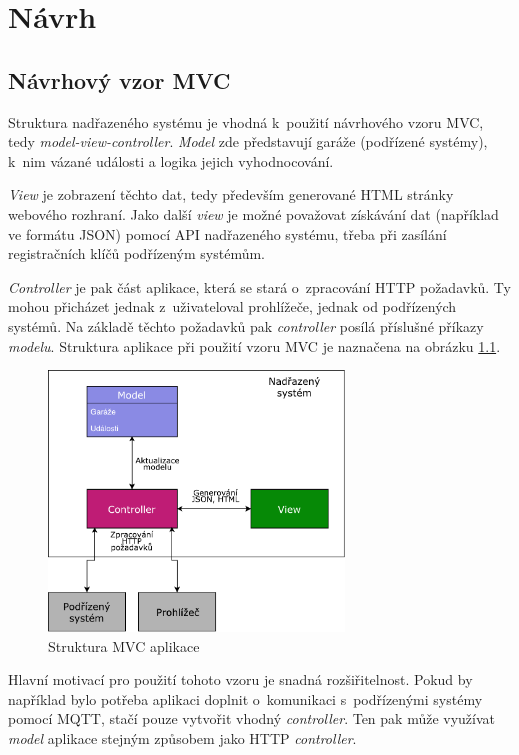 \chapter{Návrh}
\label{sec:de}

\section{Návrhový vzor MVC}
\label{sec:de_mvc}

Struktura nadřazeného systému je vhodná k~použití návrhového vzoru MVC, tedy \textit{model-view-controller}. \textit{Model} zde představují garáže (podřízené systémy), k~nim vázané události a logika jejich vyhodnocování. 

\textit{View} je zobrazení těchto dat, tedy především generované HTML stránky webového rozhraní. Jako další \textit{view} je možné považovat získávání dat (například ve formátu JSON) pomocí API nadřazeného systému, třeba při zasílání registračních klíčů podřízeným systémům.

\textit{Controller} je pak část aplikace, která se stará o~zpracování HTTP požadavků. Ty mohou přicházet jednak z~uživateloval prohlížeče, jednak od podřízených systémů. Na základě těchto požadavků pak \textit{controller} posílá příslušné příkazy \textit{modelu}. Struktura aplikace při použití vzoru MVC je naznačena na obrázku \ref{fig:mvc}.

\begin{figure}[h!]
    \centering
    \includegraphics[width=0.7\textwidth]{images/mvc.pdf}
    \caption{Struktura MVC aplikace}
    \label{fig:mvc}
\end{figure}

Hlavní motivací pro použití tohoto vzoru je snadná rozšiřitelnost. Pokud by například bylo potřeba aplikaci doplnit o~komunikaci s~podřízenými systémy pomocí MQTT, stačí pouze vytvořit vhodný \textit{controller}. Ten pak může využívat \textit{model} aplikace stejným způsobem jako HTTP \textit{controller}.

